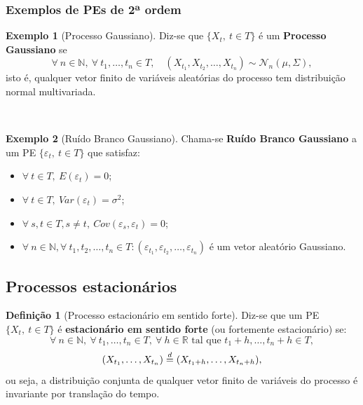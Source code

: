 \documentclass[
  11pt,
  a4paper,
]{book}
\theoremstyle{definition}
\newtheorem{definition}{Definição}[chapter]
\theoremstyle{definition}
\newtheorem{example}{Exemplo}[chapter]
\theoremstyle{definition}
\theoremstyle{definition}
\theoremstyle{remark}
\begin{document}
\subsubsection{Exemplos de PEs de 2ª ordem}\label{exemplos-de-pes-de-2uxaa-ordem}

\begin{example}[Processo Gaussiano]
Diz-se que \(\{X_t, ~t \in T\}\) é um \textbf{Processo Gaussiano} se
\[
\forall ~n \in \mathbb{N},~ \forall ~t_1, \ldots, t_n \in T, \quad (X_{t_1}, X_{t_2}, \ldots, X_{t_n}) \sim \mathcal{N}_n(\mu, \Sigma),
\]
isto é, qualquer vetor finito de variáveis aleatórias do processo tem distribuição normal multivariada.
\end{example}

\(\,\)

\begin{example}[Ruído Branco Gaussiano]

Chama-se \textbf{Ruído Branco Gaussiano} a um PE \(\{\varepsilon_t, ~t \in T\}\) que satisfaz:

\begin{itemize}
\item
  \(\forall ~t \in T, ~E(\varepsilon_t)=0\);
\item
  \(\forall ~t \in T, ~Var(\varepsilon_t)=\sigma^2\);
\item
  \(\forall ~s, t \in T, s \neq t, ~Cov(\varepsilon_s,\varepsilon_t)=0\);
\item
  \(\forall ~n \in \mathbb{N}, \forall ~t_1, t_2, \ldots, t_n \in T: (\varepsilon_{t_1}, \varepsilon_{t_2}, \ldots, \varepsilon_{t_n})\) é um vetor aleatório Gaussiano.
\end{itemize}

\end{example}

\subsection{Processos estacionários}\label{processos-estacionarios}

\begin{definition}[Processo estacionário em sentido forte]
Diz-se que um PE \(\{X_t,~ t \in T\}\) é \textbf{estacionário em sentido forte} (ou fortemente estacionário) se:
\[\forall~n \in \mathbb{N},~ \forall~t_1, \ldots, t_n \in T,~ \forall~h \in \mathbb{R} \text{ tal que } t_1 + h, \ldots, t_n + h \in T,\]
\[(X_{t_1}, \ldots, X_{t_n}) \buildrel d \over = (X_{t_1+h}, \ldots, X_{t_n+h}),\]
ou seja, a distribuição conjunta de qualquer vetor finito de variáveis do processo é invariante por translação do tempo.
\end{definition}
\end{document}

